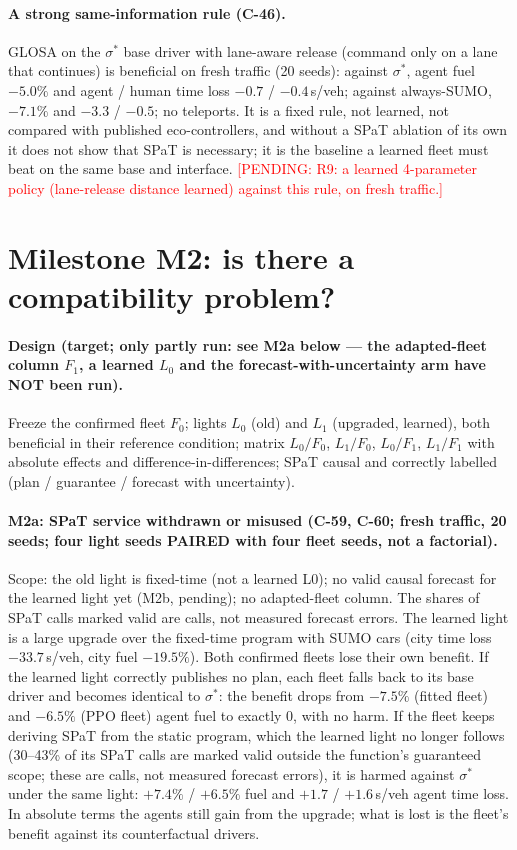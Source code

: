 \documentclass[11pt]{article}
\newcommand{\pending}[1]{\textcolor{red}{[PENDING: #1]}}
\begin{document}
\paragraph{A strong same-information rule (C-46).} GLOSA on the $\sigma^*$ base driver with lane-aware release (command only on a lane
that continues) is beneficial on fresh traffic (20 seeds): against $\sigma^*$, agent fuel $-5.0\%$ and agent / human time loss $-0.7$ /
$-0.4$\,s/veh; against always-SUMO, $-7.1\%$ and $-3.3$ / $-0.5$; no teleports. It is a fixed rule, not learned, not compared with
published eco-controllers, and without a SPaT ablation of its own it does not show that SPaT is necessary; it is the baseline a learned
fleet must beat on the same base and interface.
\pending{R9: a learned 4-parameter policy (lane-release distance learned) against this rule, on fresh traffic.}

\section{Milestone M2: is there a compatibility problem?}
\paragraph{Design (target; only partly run: see M2a below --- the adapted-fleet column $F_1$, a learned $L_0$ and the forecast-with-uncertainty arm have NOT been run).} Freeze the confirmed fleet $F_0$; lights $L_0$ (old) and $L_1$ (upgraded, learned), both beneficial in their
reference condition; matrix $L_0/F_0$, $L_1/F_0$, $L_0/F_1$, $L_1/F_1$ with absolute effects and difference-in-differences; SPaT
causal and correctly labelled (plan / guarantee / forecast with uncertainty).
\paragraph{M2a: SPaT service withdrawn or misused (C-59, C-60; fresh traffic, 20 seeds; four light seeds PAIRED with four fleet
seeds, not a factorial).} Scope: the old light is fixed-time (not a learned L0); no valid causal forecast for the learned light yet
(M2b, pending); no adapted-fleet column. The shares of SPaT calls marked valid are calls, not measured forecast errors. The learned light is a large
upgrade over the fixed-time program with SUMO cars (city time loss $-33.7$\,s/veh, city fuel $-19.5\%$). Both confirmed fleets lose their
own benefit. If the learned light correctly publishes no plan, each fleet falls back to its base driver and becomes identical to
$\sigma^*$: the benefit drops from $-7.5\%$ (fitted fleet) and $-6.5\%$ (PPO fleet) agent fuel to exactly 0, with no harm. If the fleet
keeps deriving SPaT from the static program, which the learned light no longer follows (30--43\% of its SPaT calls are marked valid
outside the function's guaranteed scope; these are calls, not measured forecast errors), it is harmed against $\sigma^*$ under the same light: $+7.4\%$ / $+6.5\%$ fuel and $+1.7$ / $+1.6$\,s/veh agent time loss. In
absolute terms the agents still gain from the upgrade; what is lost is the fleet's benefit against its counterfactual drivers.
\end{document}
